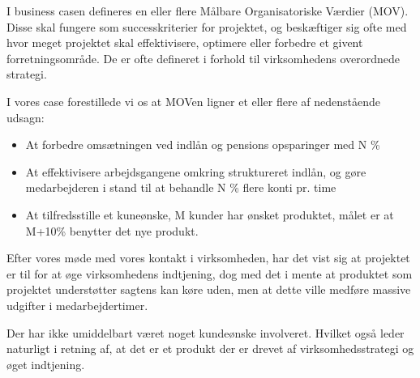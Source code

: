 I business casen defineres en eller flere Målbare Organisatoriske Værdier (MOV).
Disse skal fungere som successkriterier for projektet, og beskæftiger sig
ofte med hvor meget projektet skal effektivisere, optimere eller forbedre et
givent forretningsområde. De er ofte defineret i forhold til virksomhedens
overordnede strategi.

I vores case forestillede vi os at MOVen ligner et eller flere af nedenstående
udsagn:

\begin{itemize}
  \item At forbedre omsætningen ved indlån og pensions opsparinger med N \%

  \item At effektivisere arbejdsgangene omkring struktureret indlån, og gøre
medarbejderen i stand til at behandle N \% flere konti pr. time

  \item At tilfredsstille et kuneønske, M kunder har ønsket produktet, målet er at
M+10\% benytter det nye produkt.
\end{itemize}

Efter vores møde med vores kontakt i virksomheden, har det vist sig at projektet er til
for at øge virksomhedens indtjening, dog med det i mente at produktet som
projektet understøtter sagtens kan køre uden, men at dette ville medføre
massive udgifter i medarbejdertimer.

Der har ikke umiddelbart været noget kundeønske involveret. Hvilket også leder
naturligt i retning af, at det er et produkt der er drevet af virksomhedsstrategi
og øget indtjening.

